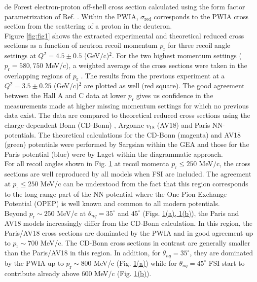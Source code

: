 de Forest \cite{DEFOREST1983} electron-proton off-shell cross section calculated using the form factor parametrization of Ref. \cite{PhysRevC.69.022201}.
Within the PWIA, $\sigma_{\mathrm{red}}$ corresponds to the PWIA cross section from the scattering of a proton in the deuteron. \\
\indent Figure \ref{fig:fig1} shows the extracted experimental and theoretical reduced cross sections as a function of neutron recoil momentum
$p_{\mathrm{r}}$ for three recoil angle settings at $Q^{2}=4.5\pm0.5$ (GeV/c)$^{2}$. For the two highest momentum settings ($p_{\mathrm{r}}=580, 750$ MeV/c), a weighted average of the cross sections were taken in the overlapping regions of $p_{\mathrm{r}}$ . The results from the previous experiment \cite{PhysRevLett.107.262501} at a $Q^{2}=3.5\pm0.25$ (GeV/c)$^{2}$ are plotted as well (red square). The good agreement between the Hall A and C data at lower $p_{\mathrm{r}}$
gives us confidence in the measurements made at higher missing momentum settings for which no previous data exist.
The data are compared to theoretical reduced
cross sections using the charge-dependent Bonn (CD-Bonn) \cite{PhysRevC.63.024001}, Argonne $v_{18}$ (AV18) \cite{PhysRevC.51.38} and Paris \cite{PhysRevC.21.861} NN-potentials. The theoretical calculations
for the CD-Bonn (magenta) and AV18 (green) potentials were performed by Sargsian \cite{PhysRevC.82.014612} within the GEA and those for the Paris potential (blue) were by Laget \cite{LAGET2005} within the diagrammatic approach.\\
\indent For all recoil angles shown in Fig. \hyperref[fig:fig1]{1} at recoil momenta $p_{\mathrm{r}}\leq250$ MeV/c, the cross sections are well reproduced by all models when FSI are included.
The agreement at $p_{\mathrm{r}}\leq250$ MeV/c can be understood from the fact that this region corresponds to the long-range part of the NN potential where the One Pion Exchange Potential (OPEP)
is well known and common to all modern potentials. \\
\indent Beyond $p_{\mathrm{r}}\sim250$ MeV/c at $\theta_{nq}=35^{\circ}$ and $45^{\circ}$ (Figs. \hyperref[fig:fig1]{1(a), 1(b)}), the Paris and
AV18 models increasingly differ from the CD-Bonn calculation. In this region, the Paris/AV18 cross sections are dominated by the PWIA and in good agreement up to $p_{\mathrm{r}}\sim700$ MeV/c. The CD-Bonn cross sections in contrast are generally smaller than the Paris/AV18 in this region.  In addition, for $\theta_{nq}=35^{\circ}$, they are dominated by the PWIA up to $p_{\mathrm{r}}\sim800$ MeV/c (Fig. \hyperref[fig:fig1]{1(a)})  while for $\theta_{nq}=45^{\circ}$  FSI start to contribute already above 600 MeV/c (Fig. \hyperref[fig:fig1]{1(b)}).\\
